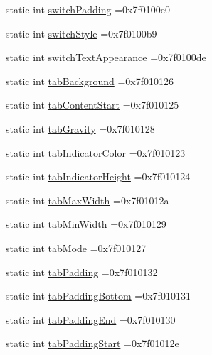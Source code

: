 \begin{DoxyCompactItemize}
\item 
static int \hyperlink{classandroid_1_1support_1_1v4_1_1R_1_1attr_ae0ed2143b3908d058aa5f5b0551d683d}{switch\+Padding} =0x7f0100e0
\item 
static int \hyperlink{classandroid_1_1support_1_1v4_1_1R_1_1attr_a80e91f4f034c963ef017cfc248a69164}{switch\+Style} =0x7f0100b9
\item 
static int \hyperlink{classandroid_1_1support_1_1v4_1_1R_1_1attr_a1b21b5a978f7e9880ff0cb866c5c1225}{switch\+Text\+Appearance} =0x7f0100de
\item 
static int \hyperlink{classandroid_1_1support_1_1v4_1_1R_1_1attr_aaa4e3120a1afbdbe6b11c73e2c22da5c}{tab\+Background} =0x7f010126
\item 
static int \hyperlink{classandroid_1_1support_1_1v4_1_1R_1_1attr_ac204edcd2e822d7fbf8758c3d7ebd316}{tab\+Content\+Start} =0x7f010125
\item 
static int \hyperlink{classandroid_1_1support_1_1v4_1_1R_1_1attr_a97c428cfd4a88c1bf6fe855469390abe}{tab\+Gravity} =0x7f010128
\item 
static int \hyperlink{classandroid_1_1support_1_1v4_1_1R_1_1attr_a75cc391c8e9b6a17ccd48f0d7c092d01}{tab\+Indicator\+Color} =0x7f010123
\item 
static int \hyperlink{classandroid_1_1support_1_1v4_1_1R_1_1attr_a74c5fb6adf86e709c57704f21e358c75}{tab\+Indicator\+Height} =0x7f010124
\item 
static int \hyperlink{classandroid_1_1support_1_1v4_1_1R_1_1attr_a926a07daeb0c2ad7c63bcf15ce23fc3c}{tab\+Max\+Width} =0x7f01012a
\item 
static int \hyperlink{classandroid_1_1support_1_1v4_1_1R_1_1attr_af1e0e4313ae239f4f9b041b85893ed7e}{tab\+Min\+Width} =0x7f010129
\item 
static int \hyperlink{classandroid_1_1support_1_1v4_1_1R_1_1attr_a3e4b1597143989d6562d2c5319323044}{tab\+Mode} =0x7f010127
\item 
static int \hyperlink{classandroid_1_1support_1_1v4_1_1R_1_1attr_a70e00cd44bcb59cc8adb7ddc6003d584}{tab\+Padding} =0x7f010132
\item 
static int \hyperlink{classandroid_1_1support_1_1v4_1_1R_1_1attr_a53cfe2100a0ac56209ac806c16b017d1}{tab\+Padding\+Bottom} =0x7f010131
\item 
static int \hyperlink{classandroid_1_1support_1_1v4_1_1R_1_1attr_a3c00f29ec303b55023371ac28507ec3b}{tab\+Padding\+End} =0x7f010130
\item 
static int \hyperlink{classandroid_1_1support_1_1v4_1_1R_1_1attr_a4a489149b8ed97ee692ee9e9dbd14715}{tab\+Padding\+Start} =0x7f01012e

\end{DoxyCompactItemize}
